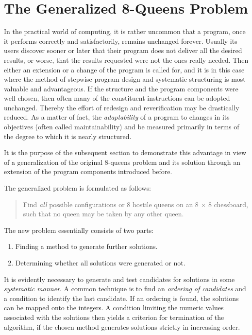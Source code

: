 \section{The Generalized 8-Queens Problem}

In the practical world of computing, it is rather uncommon that a program, once
it performs correctly and satisfactorily, remains unchanged forever.  Usually
its users discover sooner or later that their program does not deliver all the
desired results, or worse, that the results requested were not the ones really
needed.  Then either an extension or a change of the program is called for, and
it is in this case where the method of stepwise program design and systematic
structuring is most valuable and advantageous. If the structure and the program
components were well chosen, then often many of the constituent instructions
can be adopted unchanged.  Thereby the effort of redesign and reverification
may be drastically reduced.  As a matter of fact, the \emph{adaptability} of a
program to changes in its objectives (often called maintainability) and be
measured primarily in terms of the degree to which it is nearly structured.

It is the purpose of the subsequent section to demonstrate this advantage in
view of a generalization of the original 8-queens problem and its solution
through an extension of the program components introduced before.

The generalized problem is formulated as follows:

\begin{quote}
    Find \emph{all} possible configurations or 8 hostile queens on an
    8 $\times$ 8 chessboard, such that no queen may be taken by any other queen.
\end{quote}

The new problem essentially consists of two parts:

\begin{enumerate}
    \item Finding a method to generate further solutions.
    \item Determining whether all solutions were generated or not.
\end{enumerate}

It is evidently necessary to generate and test candidates for solutions in some
\emph{systematic manner}.  A common technique is to find an \emph{ordering of
candidates} and a condition to identify the last candidate. If an ordering is
found, the solutions can be mapped onto the integers. A condition limiting the
numeric values associated with the solutions then yields a criterion for
termination of the algorithm, if the chosen method generates solutions strictly
in increasing order.

